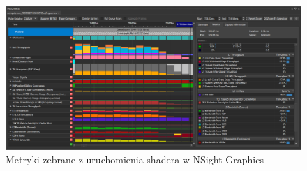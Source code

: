 \begin{figure}[t]
    \centering
    \includegraphics[width=\linewidth]{misc_figs/nsightgraphics.png}
    \caption{Metryki zebrane z uruchomienia shadera w NSight Graphics}\label{nsight_results}
\end{figure}